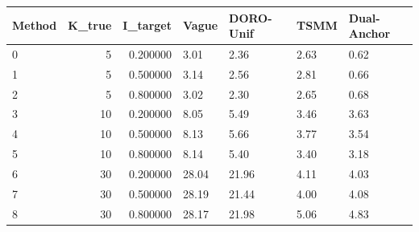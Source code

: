 \begin{tabular}{lrrllll}
\toprule
Method & K_true & I_target & Vague & DORO-Unif & TSMM & Dual-Anchor \\
\midrule
0 & 5 & 0.200000 & 3.01 & 2.36 & 2.63 & 0.62 \\
1 & 5 & 0.500000 & 3.14 & 2.56 & 2.81 & 0.66 \\
2 & 5 & 0.800000 & 3.02 & 2.30 & 2.65 & 0.68 \\
3 & 10 & 0.200000 & 8.05 & 5.49 & 3.46 & 3.63 \\
4 & 10 & 0.500000 & 8.13 & 5.66 & 3.77 & 3.54 \\
5 & 10 & 0.800000 & 8.14 & 5.40 & 3.40 & 3.18 \\
6 & 30 & 0.200000 & 28.04 & 21.96 & 4.11 & 4.03 \\
7 & 30 & 0.500000 & 28.19 & 21.44 & 4.00 & 4.08 \\
8 & 30 & 0.800000 & 28.17 & 21.98 & 5.06 & 4.83 \\
\bottomrule
\end{tabular}

